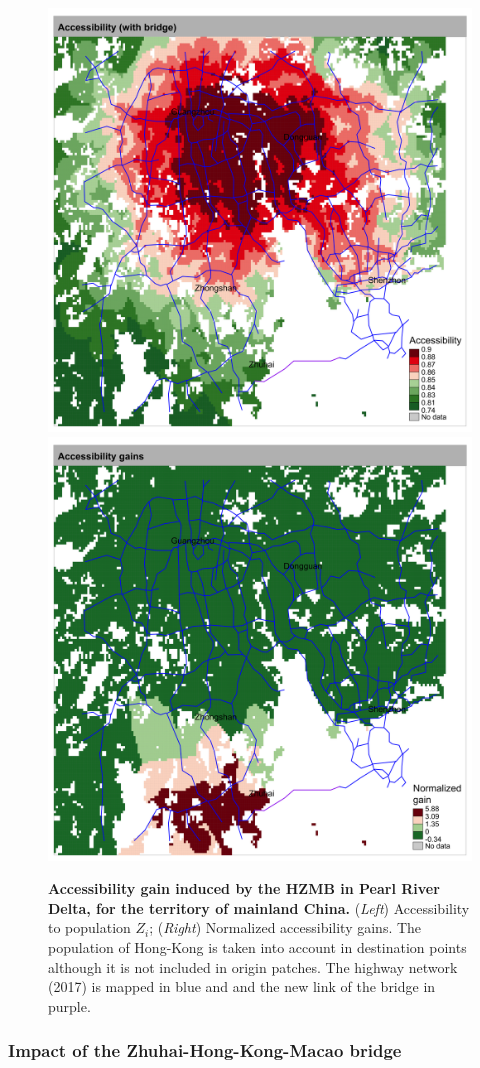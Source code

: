 \begin{figure}
	\includegraphics[width=0.49\linewidth]{figures/accessp_withbridge_prd_EN.png}
	\includegraphics[width=0.49\linewidth]{figures/accesspdiff_prd_EN.png}
	\caption{\textbf{Accessibility gain induced by the HZMB in Pearl River Delta, for the territory of mainland China.} (\textit{Left}) Accessibility to population $Z_i$; (\textit{Right}) Normalized accessibility gains. The population of Hong-Kong is taken into account in destination points although it is not included in origin patches. The highway network (2017) is mapped in blue and and the new link of the bridge in purple.\label{fig:casestudies:prd}}
\end{figure}

\subsubsection{Impact of the Zhuhai-Hong-Kong-Macao bridge}

